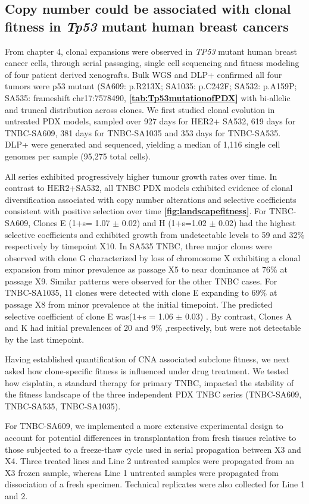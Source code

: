 \subsection{Copy number could be associated with clonal fitness in \textit{Tp53} mutant human breast cancers}
From chapter 4, clonal expansions were observed in \textit{TP53} mutant human breast cancer cells, through serial passaging, single cell sequencing and fitness modeling of four patient derived xenografts. Bulk WGS and DLP+ confirmed all four tumors were p53 mutant (SA609: p.R213X; SA1035: p.C242F; SA532: p.A159P; SA535: frameshift chr17:7578490, \textbf{\autoref{tab:Tp53mutationofPDX}} with bi-allelic and truncal distribution across clones.
We first studied clonal evolution in untreated PDX models, sampled over 927 days for HER2+ SA532, 619 days for TNBC-SA609, 381 days for TNBC-SA1035 and 353 days for TNBC-SA535. DLP+ were generated and sequenced, yielding a median of 1,116 single cell genomes per sample (95,275 total cells). 

All series exhibited progressively higher tumour growth rates over time. In contrast to HER2+SA532, all TNBC PDX models exhibited evidence of clonal diversification associated with copy number alterations and selective coefficients consistent with positive selection over time \textbf{\autoref{fig:landscapefitness}}. 
For TNBC-SA609, Clones E  (1+s= 1.07 $\pm$ 0.02) and H (1+s=1.02 $\pm$ 0.02) had the highest selective coefficients and exhibited growth from undetectable levels to 59 and 32\% respectively by timepoint X10.
In SA535 TNBC, three major clones were observed with clone G characterized by loss of chromosome X exhibiting a clonal expansion from minor prevalence as passage X5 to near dominance at 76\% at passage X9. Similar patterns were observed for the other TNBC cases.  
For TNBC-SA1035, 11 clones were detected with clone E expanding to 69\% at passage X8 from minor prevalence at the initial timepoint. The predicted selective coefficient of clone E was(1+s = 1.06 $\pm$ 0.03) . By contrast, Clones A and K had initial prevalences of 20 and 9\% ,respectively, but were not detectable by the last timepoint. 

Having established quantification of CNA associated subclone fitness, we next asked how clone-specific fitness is influenced under drug treatment. We tested how cisplatin, a standard therapy for primary TNBC, impacted the stability of the fitness landscape of the three independent PDX TNBC series (TNBC-SA609, TNBC-SA535, TNBC-SA1035).

For TNBC-SA609, we implemented a more extensive experimental design to account for potential differences in transplantation from fresh tissues relative to those subjected to a freeze-thaw cycle used in serial propagation between X3 and X4. Three treated lines and Line 2 untreated samples were propagated from an X3 frozen sample, whereas Line 1 untreated samples were propagated from dissociation of a fresh specimen. Technical replicates were also collected for Line 1 and 2.    

